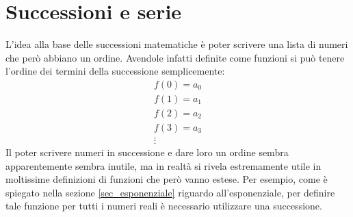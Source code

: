 \section{Successioni e serie} \label{sec_successioni}
L'idea alla base delle successioni matematiche è poter scrivere una lista di 
numeri che però abbiano un ordine. Avendole infatti definite come funzioni si 
può tenere l'ordine dei termini della successione semplicemente:
\begin{gather*}
    f(0) = a_0\\
    f(1) = a_1\\
    f(2) = a_2\\
    f(3) = a_3\\
    \vdots
\end{gather*}
Il poter scrivere numeri in successione e dare loro un ordine sembra 
apparentemente sembra inutile, ma in realtà si rivela estremamente utile in 
moltissime definizioni di funzioni che però vanno estese. Per esempio, come è 
spiegato nella sezione \ref{sec_esponenziale} riguardo all'esponenziale, per 
definire tale funzione per tutti i numeri reali è necessario utilizzare una 
successione.\\


